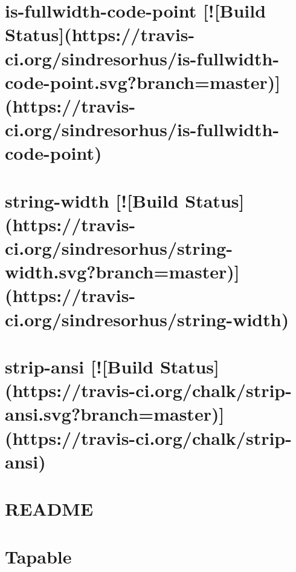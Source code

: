 \documentclass[twoside]{book}
\newcommand{\+}{\discretionary{\mbox{\scriptsize$\hookleftarrow$}}{}{}}
\begin{document}
\chapter{is-\/fullwidth-\/code-\/point \mbox{[}!\mbox{[}Build Status\mbox{]}(https\+://travis-\/ci.org/sindresorhus/is-\/fullwidth-\/code-\/point.svg?branch=master)\mbox{]}(https\+://travis-\/ci.org/sindresorhus/is-\/fullwidth-\/code-\/point)}
\label{md__c_1_workspace_demo_src_main_script_node_modules_table_node_modules_is-fullwidth-code-point_readme}

\chapter{string-\/width \mbox{[}!\mbox{[}Build Status\mbox{]}(https\+://travis-\/ci.org/sindresorhus/string-\/width.svg?branch=master)\mbox{]}(https\+://travis-\/ci.org/sindresorhus/string-\/width)}
\label{md__c_1_workspace_demo_src_main_script_node_modules_table_node_modules_string-width_readme}

\chapter{strip-\/ansi \mbox{[}!\mbox{[}Build Status\mbox{]}(https\+://travis-\/ci.org/chalk/strip-\/ansi.svg?branch=master)\mbox{]}(https\+://travis-\/ci.org/chalk/strip-\/ansi)}
\label{md__c_1_workspace_demo_src_main_script_node_modules_table_node_modules_strip-ansi_readme}

\chapter{R\+E\+A\+D\+ME}
\label{md__c_1_workspace_demo_src_main_script_node_modules_table__r_e_a_d_m_e}

\chapter{Tapable}
\label{md__c_1_workspace_demo_src_main_script_node_modules_tapable__r_e_a_d_m_e}

\end{document}
